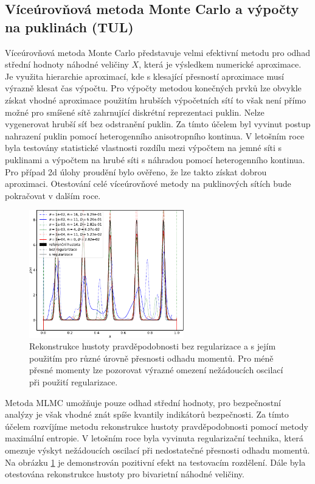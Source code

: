 \documentclass[11pt,a4paper]{article}
\begin{document}
\begin{onehalfspacing}
\subsection{Víceúrovňová metoda Monte Carlo a výpočty na puklinách (TUL)}

Víceúrovňová metoda Monte Carlo představuje velmi efektivní metodu pro odhad střední hodnoty náhodné veličiny $X$, která je výsledkem 
numerické aproximace. Je využita hierarchie aproximací, kde s klesající přesností aproximace musí výrazně klesat čas výpočtu. 
Pro výpočty metodou konečných prvků lze obvykle získat vhodné aproximace použitím hrubších výpočetních sítí to však není přímo možné
pro smíšené sítě zahrnující diskrétní reprezentaci puklin. Nelze vygenerovat hrubší síť bez odstranění puklin. Za tímto 
účelem byl vyvinut postup nahrazení puklin pomocí heterogenního anisotropního kontinua. V letošním roce byla testovány statistické vlastnosti
rozdílu mezi výpočtem na jemné síti s puklinami a výpočtem na hrubé síti s náhradou pomocí heterogenního kontinua. Pro případ 2d úlohy proudění 
bylo ověřeno, že lze takto získat dobrou aproximaci. Otestování celé víceúrovňové metody na puklinových sítích bude pokračovat v dalším roce.

\begin{figure}
    \centering
    \includegraphics[width=0.6\textwidth]{graphics/five_fingers_regul.pdf}
    \caption{Rekonstrukce hustoty pravděpodobnosti bez regularizace a s jejím použitím pro různé úrovně přesnosti odhadu momentů. Pro méně přesné momenty lze pozorovat výrazné omezení nežádoucích oscilací při použití regularizace.}
    \label{fig:hustota_regul}
\end{figure}


Metoda MLMC umožňuje pouze odhad střední hodnoty, pro bezpečnostní analýzy je však vhodné znát spíše kvantily indikátorů bezpečnosti.
Za tímto účelem rozvíjíme metodu rekonstrukce hustoty pravděpodobnosti pomocí metody maximální entropie. V letošním roce byla vyvinuta 
regularizační technika, která omezuje výskyt nežádoucích oscilací při nedostatečné přesnosti odhadu momentů. Na obrázku 
\ref{fig:hustota_regul} je demonstrován pozitivní efekt na testovacím rozdělení. Dále byla otestována rekonstrukce hustoty pro bivarietní náhodné veličiny.


\end{onehalfspacing}
\end{document}
